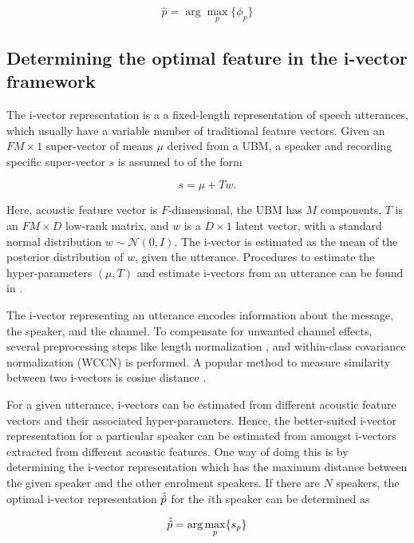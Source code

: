 \documentclass{article}
\begin{document}
\begin{equation}
\hat{p} = \arg\max_p \{\phi_p\}
\label{eq:optFeat}
\end{equation}

\subsection{Determining the optimal feature in the i-vector framework}
\label{subsec:ivec_optFeat}

The i-vector representation \cite{dehak_ivector} is a a fixed-length
representation of speech utterances, which usually have a variable number of
traditional feature vectors.  Given an $FM \times 1$ super-vector of means $\mu$
derived from a UBM, a speaker and recording specific super-vector $s$ is assumed to of
the form

\begin{equation}
s = \mu + T w.
\end{equation}

Here, acoustic feature vector is $F$-dimensional, the UBM has $M$ components,
$T$ is an $FM \times D$ low-rank matrix, and $w$ is a $D \times 1$ latent
vector, with a standard normal distribution $w \sim \mathcal{N}(0,I)$. The
i-vector is estimated as the mean of the posterior distribution of $w$, given
the utterance. Procedures to estimate the hyper-parameters $(\mu, T)$ and 
estimate i-vectors from an utterance can be found in \cite{dehak_ivector}.

The i-vector representing an utterance encodes information about the message,
the speaker, and the channel. To compensate for unwanted channel effects,
several preprocessing steps like length normalization \cite{garcia_lengthNorm},
and within-class covariance normalization (WCCN) \cite{wccn} is performed. A
popular method to measure similarity between two i-vectors is cosine 
distance \cite{dehak_ivector}.

For a given utterance, i-vectors can be estimated from different acoustic
feature vectors and their associated hyper-parameters. Hence, the
better-suited i-vector representation for a particular speaker can be estimated
from amongst i-vectors extracted from different acoustic features. One way of
doing this is by determining the i-vector representation which has the maximum
distance between the given speaker and the other enrolment speakers. If there
are $N$ speakers, the optimal i-vector representation $\Hat{\Hat{p}}$ 
for the $i$th speaker can be determined as

\begin{equation}
\Hat{\Hat{p}} = \arg\max_p \{s_p\}
\end{equation}
\end{document}
